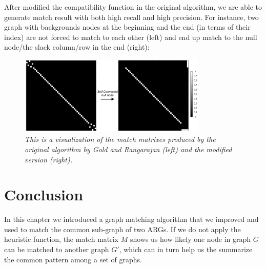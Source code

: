 After modified the compatibility function in the original algorithm, we are able to generate match result with both high recall and high precision. For instance, two graph with backgrounds nodes at the beginning and the end (in terms of their index) are not forced to match to each other (left) and end up match to the null node/the slack column/row in the end (right):
\begin{figure}[h]
	\centering
	\captionsetup{justification=centering}
	\includegraphics[width=0.8\textwidth]{figs/null_node_improve.png}
	\caption[Caption for LOF]{\emph{This is a visualization of the match matrixes produced by the original algorithm by Gold and Rangarajan (left) and the modified version (right).}}
	\label{fig:stochastic}
\end{figure}

\section{Conclusion}


In this chapter we introduced a graph matching algorithm that we improved and used to match the common sub-graph of two ARGs. If we do not apply the heuristic function, the match matrix $M$ shows us how likely one node in graph $G$ can be matched to another graph $G'$, which can in turn help us the summarize the common pattern among a set of graphs.

